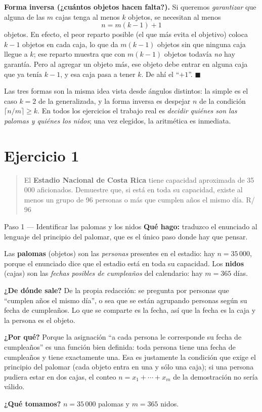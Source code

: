 \documentclass[11pt]{article}
\begin{document}
\begin{teo}
\smallskip
\textbf{Forma inversa (¿cuántos objetos hacen falta?).} Si queremos \emph{garantizar} que alguna de las $m$ cajas tenga al menos $k$ objetos, se necesitan al menos
\[
n=m(k-1)+1
\]
objetos. En efecto, el peor reparto posible (el que más evita el objetivo) coloca $k-1$ objetos en cada caja, lo que da $m(k-1)$ objetos sin que ninguna caja llegue a $k$; ese reparto muestra que con $m(k-1)$ objetos todavía \emph{no} hay garantía. Pero al agregar un objeto más, ese objeto debe entrar en alguna caja que ya tenía $k-1$, y esa caja pasa a tener $k$. De ahí el ``$+1$''. $\blacksquare$
\end{teo}

\begin{nota}
Las tres formas son la misma idea vista desde ángulos distintos: la simple es el caso $k=2$ de la generalizada, y la forma inversa es despejar $n$ de la condición $\lceil n/m\rceil\ge k$. En todos los ejercicios el trabajo real es \emph{decidir quiénes son las palomas y quiénes los nidos}; una vez elegidos, la aritmética es inmediata.
\end{nota}

\section*{Ejercicio 1}

\begin{quote}
El \textbf{Estadio Nacional de Costa Rica} tiene capacidad aproximada de 35 000 aficionados. Demuestre que, si está en toda su capacidad, existe al menos un grupo de 96 personas o más que cumplen años el mismo día. \hfill R/ 96
\end{quote}

\begin{paso}{Paso 1 --- Identificar las palomas y los nidos}
\textbf{Qué hago:} traduzco el enunciado al lenguaje del principio del palomar, que es el único paso donde hay que pensar.

Las \textbf{palomas} (objetos) son las \emph{personas} presentes en el estadio: hay $n=35\,000$, porque el enunciado dice que el estadio está en toda su capacidad. Los \textbf{nidos} (cajas) son las \emph{fechas posibles de cumpleaños} del calendario: hay $m=365$ días.

\textbf{¿De dónde sale?} De la propia redacción: se pregunta por personas que ``cumplen años el mismo día'', o sea que se están agrupando personas según su fecha de cumpleaños. Lo que se comparte es la fecha, así que la fecha es la caja y la persona es el objeto.

\textbf{¿Por qué?} Porque la asignación ``a cada persona le corresponde su fecha de cumpleaños'' es una función bien definida: toda persona tiene una fecha de cumpleaños y tiene exactamente una. Esa es justamente la condición que exige el principio del palomar (cada objeto entra en una y sólo una caja); si una persona pudiera estar en dos cajas, el conteo $n=x_1+\cdots+x_m$ de la demostración no sería válido.

\textbf{¿Qué tomamos?} $n=35\,000$ palomas y $m=365$ nidos.
\end{paso}
\end{document}
